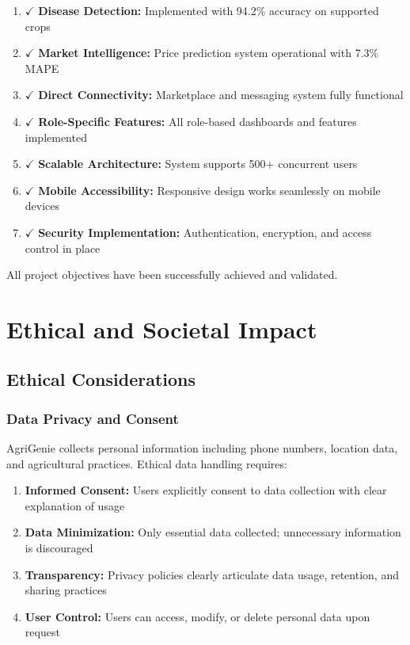 \documentclass[12pt,a4paper]{report}
\begin{document}
\begin{enumerate}
    \item $\checkmark$ \textbf{Disease Detection:} Implemented with 94.2\% accuracy on supported crops
    \item $\checkmark$ \textbf{Market Intelligence:} Price prediction system operational with 7.3\% MAPE
    \item $\checkmark$ \textbf{Direct Connectivity:} Marketplace and messaging system fully functional
    \item $\checkmark$ \textbf{Role-Specific Features:} All role-based dashboards and features implemented
    \item $\checkmark$ \textbf{Scalable Architecture:} System supports 500+ concurrent users
    \item $\checkmark$ \textbf{Mobile Accessibility:} Responsive design works seamlessly on mobile devices
    \item $\checkmark$ \textbf{Security Implementation:} Authentication, encryption, and access control in place
\end{enumerate}

All project objectives have been successfully achieved and validated.

\newpage

\chapter{Ethical and Societal Impact}

\section{Ethical Considerations}

\subsection{Data Privacy and Consent}

AgriGenie collects personal information including phone numbers, location data, and agricultural practices. Ethical data handling requires:

\begin{enumerate}
    \item \textbf{Informed Consent:} Users explicitly consent to data collection with clear explanation of usage
    \item \textbf{Data Minimization:} Only essential data collected; unnecessary information is discouraged
    \item \textbf{Transparency:} Privacy policies clearly articulate data usage, retention, and sharing practices
    \item \textbf{User Control:} Users can access, modify, or delete personal data upon request
\end{enumerate}
\end{document}
